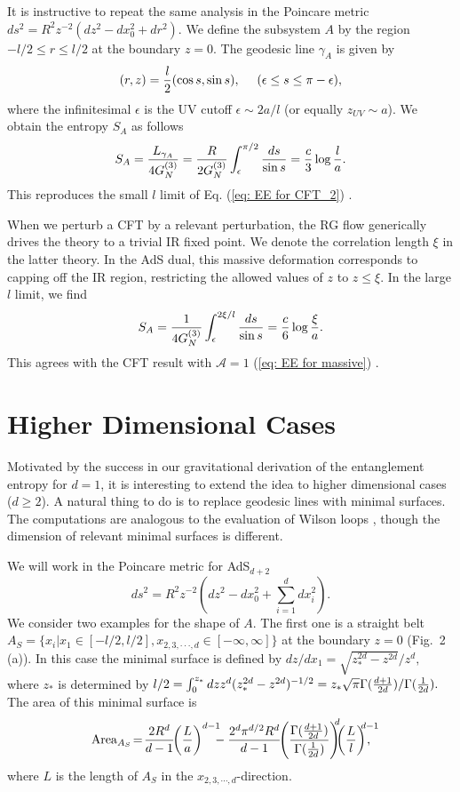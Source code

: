 \documentclass[amsmath,amssymb,nofootinbib,eqsecnum,tighten,prd,12pt]{revtex4}
\def\ep{{\epsilon}}
\def\frac#1#2{{#1\over #2}}
\def\s{\sqrt}
\def\f {\frac}
\def\ddd{\cdot\cdot\cdot}
\def\ep{\epsilon}
\def\ep{{\epsilon}}
\def\frac#1#2{{#1\over #2}}
\def\s{\sqrt}
\def\be{\begin{equation}}
\def\ee{\end{equation}}
\begin{document}
It is instructive to repeat the same analysis in the Poincare
metric $ ds^2=R^2 z^{-2}(dz^2-dx_0^2+dr^2). $
We define the subsystem $A$ by the region $-l/2\leq r\leq l/2$ at the boundary  $z=0$.
The geodesic line $\gamma_A$ is given by  \be (r,z)=\f{l}{2}(\cos
s,\sin s),\ \ \ \ (\ep\leq s \leq \pi-\ep), \label{minc} \ee where
the infinitesimal $\ep$ is
the UV cutoff $\ep\sim 2a/l$ (or equally $z_{UV}\sim a$). We obtain the entropy $S_A$
as follows \be S_A=\f{L_{\gamma_A}}
{4G^{(3)}_N}=\f{R}{2G^{(3)}_N}\int^{\pi/2}_\ep
\f{ds}{\sin s}=\f{c}{3}\log\f{l}{a}. \ee
This reproduces  the small $l$ limit
of Eq. (\ref{eq: EE for CFT_2}) \cite{Holzhey94} .

When we perturb a CFT by a relevant perturbation, the RG flow
generically drives the theory to a trivial IR fixed point.  We
denote the correlation length $\xi$ in the latter theory. In the
AdS dual, this massive deformation corresponds to capping
off the IR region, restricting the allowed values of $z$ to $z\leq
\xi$. In the large $l$ limit, we find \be
S_A =\f{1}{4G^{(3)}_N} \int^{2\xi/l}_{\ep}\f{ds}{\sin
s}=\f{c}{6}\log\f{\xi}{a}. \ee
This agrees with the CFT result
with $\mathcal{A}=1$
(\ref{eq: EE for massive})  \cite{VLRK,Calabrese04}.


\section{Higher Dimensional Cases}

Motivated by the success in
 our gravitational derivation of the entanglement
entropy for $d=1$, it is interesting to extend the idea to higher dimensional
cases ($d\geq 2$).
A natural thing to do is to replace
geodesic lines with minimal surfaces.
The computations are
analogous to the evaluation
of Wilson loops \cite{Wilsonline}, though the dimension of relevant
minimal surfaces is different.


We will work in the Poincare metric for AdS$_{d+2}$ \be ds^2=R^2
z^{-2} (dz^2-dx_0^2+\sum_{i=1}^d dx_i^2).  \label{Poincare} \ee We
consider two examples for the shape of $A$. The first one is a
straight belt $A_{S}=\{x_i|x_1\in [-l/2,l/2], x_{2,3,\ddd,d}\in
[-\infty,\infty]\}$ at the boundary $z=0$ (Fig.\ 2 (a)). In this
case the minimal surface is defined by $
dz/dx_1=\s{z^{2d}_*-z^{2d}}/z^d, $ where $z_*$ is determined by $
l/2=\int^{z_*}_{0}dz z^d (z^{2d}_*-z^{2d})^{-1/2} =z_* \s{\pi}
\Gamma(\f{d+1}{2d})/\Gamma(\f{1}{2d}). $ The area of this minimal
surface is \be {\rm
Area}_{A_{S}}\!=\!\f{2R^d}{d-1}\!\!\left(\f{L}{a}\right)^{d-1}\!\!\!\!
-\f{2^d \pi^{d/2} R^{d}}{d-1}\!\!\left(\f{\Gamma(\f{d+1}{2d})}
{\Gamma(\f{1}{2d})}\right)^{\!\!\!d}\!\!\!
\left(\f{L}{l}\right)^{\!\!\! d-1}\!\!\!\!\!\!\!, \label{areaone}
\ee where $L$ is the length of $A_S$ in the
$x_{2,3,\cdots,d}$-direction.
\end{document}
